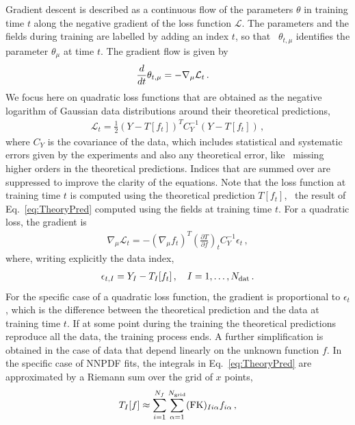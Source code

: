 \documentclass[11pt]{article}
\begin{document}
Gradient descent is described as a continuous flow of the parameters $\theta$ in training time $t$
along the negative gradient of the loss function $\mathcal{L}$. The parameters and the fields during
training are labelled by adding an index $t$, so that \eg\ $\theta_{t,\mu}$ identifies the parameter
$\theta_\mu$ at time $t$.
The gradient flow is given by
\begin{align}
    \label{eq:GradientFlowDef}
    \frac{d}{dt} &\theta_{t,\mu} = -\nabla_\mu \mathcal{L}_t\, .
\end{align}
We focus here on quadratic loss functions that are obtained as the negative logarithm of Gaussian
data distributions around their theoretical predictions,
\begin{align}
    \label{eq:QuadLoss}
    \mathcal{L}_t = \frac12 \left(Y - T[f_t]\right)^T C_Y^{-1} \left(Y - T[f_t]\right)\, ,
\end{align}
where $C_Y$ is the covariance of the data, which includes statistical and systematic errors given by
the experiments and also any theoretical error, like \eg\ missing higher orders in the theoretical
predictions. Indices that are summed over are suppressed to improve the clarity of the equations.
Note that the loss function at training time $t$ is computed using the theoretical prediction $T[f_t]$,
\ie\ the result of Eq.~\eqref{eq:TheoryPred} computed using the fields at training time $t$. For a quadratic
loss, the gradient is
\begin{align}
    \nabla_\mu \mathcal{L}_t = - \left(\nabla_\mu f_t\right)^T \left(\frac{\partial T}{\partial f}\right)_t
      C_Y^{-1} \epsilon_t\, ,
\end{align}
where, writing explicitly the data index,
\begin{align}
    \label{eq:EpsDef}
    \epsilon_{t,I} = Y_I - T_I[f_t]\, , \quad I=1, \ldots, N_{\mathrm{dat}}\, .
\end{align}
For the specific case of a quadratic loss function, the gradient is proportional to $\epsilon_t$, which
is the difference between the theoretical prediction and the data at training time $t$. If at some point
during the training the theoretical predictions reproduce all the data, the training process ends.
A further simplification is obtained in the case of data that depend linearly on the unknown function $f$.
In the specific case of NNPDF fits, the integrals in Eq.~\eqref{eq:TheoryPred} are approximated by
a Riemann sum over the grid of $x$ points,
\begin{align}
    \label{eq:FKTabDef}
    T_I[f] \approx \sum_{i=1}^{N_{f}}\sum_{\alpha=1}^{N_{\mathrm{grid}}} (\mathrm{FK})_{Ii\alpha} f_{i\alpha}\, ,
\end{align}
\end{document}
